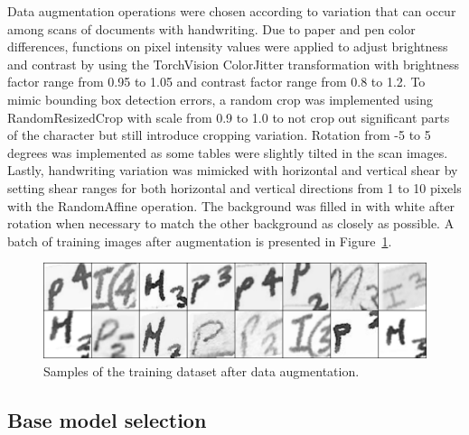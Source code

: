 \documentclass[english,twoside,openright]{UH_DS_MSc}
\begin{document}
Data augmentation operations were chosen according to variation that can 
occur among scans of documents with handwriting.
Due to paper and pen color differences, functions on pixel intensity
values were applied to adjust brightness and contrast by using the 
TorchVision ColorJitter transformation with brightness factor range from 
0.95 to 1.05 and contrast factor range from 0.8 to 1.2. To mimic bounding box detection errors, 
a random crop was implemented using RandomResizedCrop with 
scale from 0.9 to 1.0 to not crop out significant parts of the character but 
still introduce cropping variation. Rotation from -5 to 5 degrees 
was implemented as some tables were slightly tilted in the scan images. 
Lastly, handwriting variation was mimicked with horizontal and vertical 
shear by setting shear ranges for both horizontal and vertical directions from 1 
to 10 pixels with the RandomAffine operation. The background was filled in 
with white after rotation when necessary to match the other background as closely as possible.
 A batch of training images after augmentation
is presented in Figure~\ref{image:augmented}.

\begin{figure}[ht]
    \centering
    \includegraphics*[scale=.2]{images/augmented.png}
    \caption{Samples of the training dataset after data augmentation.}
    \label{image:augmented}
\end{figure}

\subsection{Base model selection}
\end{document}
